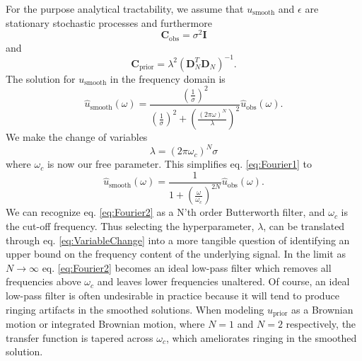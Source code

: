 \documentclass[10pt,a4paper]{article}
\begin{document}
For the purpose analytical tractability, we assume that $u_\mathrm{smooth}$ and $\epsilon$ are stationary stochastic processes and furthermore
\begin{equation}
\mathbf{C}_\mathrm{obs} = \sigma^2 \mathbf{I}
\end{equation}  
and
\begin{equation}
\mathbf{C}_\mathrm{prior} = \lambda^2 (\mathbf{D}_N^T\mathbf{D}_N)^{-1}.
\end{equation}
The solution for $u_\mathrm{smooth}$ in the frequency domain is
\begin{equation}\label{eq:Fourier1}
\hat{u}_\mathrm{smooth}(\omega) = \frac{\left(\frac{1}{\sigma}\right)^2}
                                  {\left(\frac{1}{\sigma}\right)^2 + \left(\frac{(2\pi\omega)^N}{\lambda}\right)^2}
                                  \hat{u}_\mathrm{obs}(\omega).
\end{equation}
We make the change of variables
\begin{equation}\label{eq:VariableChange}
\lambda = (2\pi\omega_c)^N\sigma
\end{equation}
where $\omega_c$ is now our free parameter. This simplifies eq. \ref{eq:Fourier1} to
\begin{equation}\label{eq:Fourier2}
\hat{u}_\mathrm{smooth}(\omega) = \frac{1}
                                  {1 + \left(\frac{\omega}{\omega_c}\right)^{2N}}
                                  \hat{u}_\mathrm{obs}(\omega).
\end{equation}
We can recognize eq. \ref{eq:Fourier2} as a N'th order Butterworth filter, and $\omega_c$ is the cut-off frequency.  Thus selecting the hyperparameter, $\lambda$, can be translated through eq. \ref{eq:VariableChange} into a more tangible question of identifying an upper bound on the frequency content of the underlying signal. In the limit as $N\to \infty$ eq. \ref{eq:Fourier2} becomes an ideal low-pass filter which removes all frequencies above $\omega_c$ and leaves lower frequencies unaltered.  Of course, an ideal low-pass filter is often undesirable in practice because it will tend to produce ringing artifacts in the smoothed solutions.  When modeling $u_\mathrm{prior}$ as a Brownian motion or integrated Brownian motion, where $N=1$ and $N=2$ respectively, the transfer function is tapered across $\omega_c$, which ameliorates ringing in the smoothed solution.  
\end{document}
